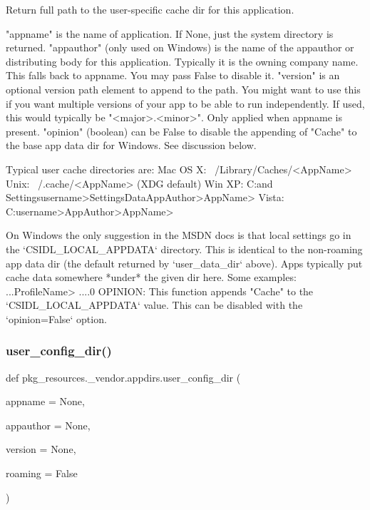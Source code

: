 \begin{DoxyVerb}Return full path to the user-specific cache dir for this application.

    "appname" is the name of application.
        If None, just the system directory is returned.
    "appauthor" (only used on Windows) is the name of the
        appauthor or distributing body for this application. Typically
        it is the owning company name. This falls back to appname. You may
        pass False to disable it.
    "version" is an optional version path element to append to the
        path. You might want to use this if you want multiple versions
        of your app to be able to run independently. If used, this
        would typically be "<major>.<minor>".
        Only applied when appname is present.
    "opinion" (boolean) can be False to disable the appending of
        "Cache" to the base app data dir for Windows. See
        discussion below.

Typical user cache directories are:
    Mac OS X:   ~/Library/Caches/<AppName>
    Unix:       ~/.cache/<AppName> (XDG default)
    Win XP:     C:\Documents and Settings\<username>\Local Settings\Application Data\<AppAuthor>\<AppName>\Cache
    Vista:      C:\Users\<username>\AppData\Local\<AppAuthor>\<AppName>\Cache

On Windows the only suggestion in the MSDN docs is that local settings go in
the `CSIDL_LOCAL_APPDATA` directory. This is identical to the non-roaming
app data dir (the default returned by `user_data_dir` above). Apps typically
put cache data somewhere *under* the given dir here. Some examples:
    ...\Mozilla\Firefox\Profiles\<ProfileName>\Cache
    ...\Acme\SuperApp\Cache\1.0
OPINION: This function appends "Cache" to the `CSIDL_LOCAL_APPDATA` value.
This can be disabled with the `opinion=False` option.
\end{DoxyVerb}
 \mbox{\label{namespacepkg__resources_1_1__vendor_1_1appdirs_a30f0cf6e4ca4ce5a3b7d3c58e5049f05}} 
\subsubsection{\texorpdfstring{user\+\_\+config\+\_\+dir()}{user\_config\_dir()}}
{\footnotesize\ttfamily def pkg\+\_\+resources.\+\_\+vendor.\+appdirs.\+user\+\_\+config\+\_\+dir (\begin{DoxyParamCaption}\item[{}]{appname = {\ttfamily None},  }\item[{}]{appauthor = {\ttfamily None},  }\item[{}]{version = {\ttfamily None},  }\item[{}]{roaming = {\ttfamily False} }\end{DoxyParamCaption})}


